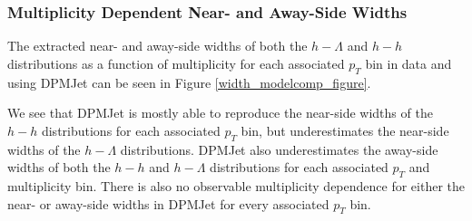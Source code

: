 \documentclass[ALICE,manyauthors]{ALICE_analysis_notes}
\begin{document}
\subsubsection{Multiplicity Dependent Near- and Away-Side Widths}
\label{width_modelcomp}
The extracted near- and away-side widths of both the $h-\Lambda$ and $h-h$ distributions as a function of multiplicity for each associated $p_{T}$ bin in data and using DPMJet can be seen in Figure \ref{width_modelcomp_figure}. 

We see that DPMJet is mostly able to reproduce the near-side widths of the $h-h$ distributions for each associated $p_{T}$ bin, but underestimates the near-side widths of the $h-\Lambda$ distributions. DPMJet also underestimates the away-side widths of both the $h-h$ and $h-\Lambda$ distributions for each associated $p_{T}$ and multiplicity bin. There is also no observable multiplicity dependence for either the near- or away-side widths in DPMJet for every associated $p_{T}$ bin.
\end{document}
